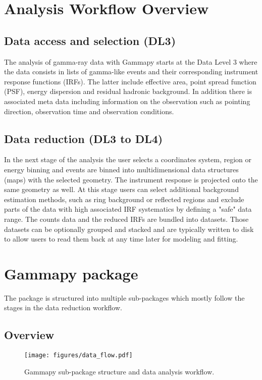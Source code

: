 \section{Analysis Workflow Overview}
\label{sec:analysis-workflow-overview}

\subsection{Data access and selection (DL3)}

The analysis of gamma-ray data with Gammapy starts at the Data Level 3 where the data consists
in lists of gamma-like events and their corresponding instrument response functions (IRFs).
The latter include effective area, point spread function (PSF), energy dispersion and
residual hadronic background. In addition there is associated meta data including information
on the observation such as pointing direction, observation time and observation conditions.

\subsection{Data reduction (DL3 to DL4)}

In the next stage of the analysis the user selects a coordinates system, region or
energy binning and events are binned into multidimensional data structures (maps)
with the selected geometry. The instrument response is projected onto the
same geometry as well. At this stage users can select additional background
estimation methods, such as ring background or reflected regions and
exclude parts of the data with high associated IRF systematics by defining
a "safe" data range. The counts data and the reduced IRFs are bundled into
datasets. Those datasets can be optionally grouped and stacked and are
typically written to disk to allow users to read them back at any time later
for modeling and fitting.

\section{Gammapy package}
\label{sec:gammapy-package}

The \gammapy package is structured into multiple sub-packages which mostly
follow the stages in the data reduction workflow.

\subsection{Overview}
\label{ssec:overview}
\begin{figure*}[t]
	\centering
	\texttt{[image: figures/data\_flow.pdf]}
	\caption{
		Gammapy sub-package structure and data analysis workflow. }
	\label{fig:data_flow} \end{figure*}

